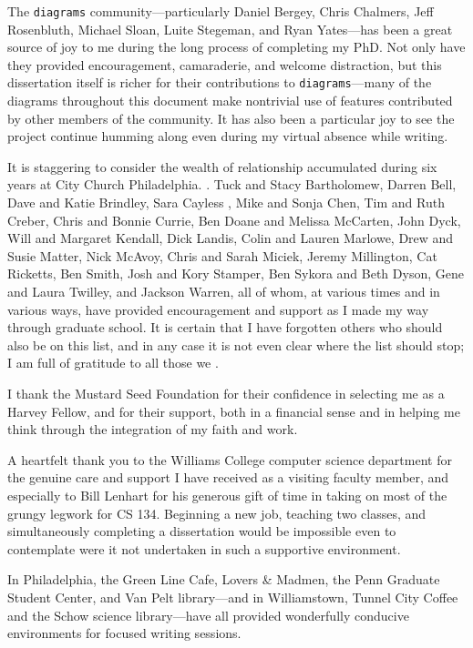The \texttt{diagrams} community---particularly Daniel Bergey, Chris
Chalmers, Jeff Rosenbluth, Michael Sloan, Luite Stegeman, and Ryan
Yates---has been a great source of joy to me during the long process
of completing my PhD.  Not only have they provided encouragement,
camaraderie, and welcome distraction, but this dissertation itself is
richer for their contributions to \texttt{diagrams}---many of the
diagrams throughout this document make nontrivial use of features
contributed by other members of the community.  It has also been a
particular joy to see the project continue humming along even during
my virtual absence while writing.

It is staggering to consider the wealth of relationship accumulated
during six years at City Church Philadelphia. .  Tuck and Stacy Bartholomew, Darren Bell, Dave and
Katie Brindley, Sara Cayless , Mike and Sonja Chen,
Tim and Ruth Creber, Chris and Bonnie Currie, Ben Doane and Melissa
McCarten, John Dyck, Will and Margaret Kendall, Dick Landis, Colin and
Lauren Marlowe, Drew and Susie Matter, Nick McAvoy, Chris and Sarah
Miciek, Jeremy Millington, Cat Ricketts, Ben Smith, Josh and Kory
Stamper, Ben Sykora and Beth Dyson, Gene and Laura Twilley, and
Jackson Warren, all of whom, at various times and in various ways,
have provided encouragement and support as I made my way through
graduate school. It is certain that I have forgotten others who should
also be on this list, and in any case it is not even clear where the
list should stop; I am full of gratitude to all those we
.

I thank the Mustard Seed Foundation for their confidence in selecting
me as a Harvey Fellow, and for their support, both in a financial
sense and in helping me think through the integration of my faith and
work.

A heartfelt thank you to the Williams College computer science
department for the genuine care and support I have received as a
visiting faculty member, and especially to Bill Lenhart for his
generous gift of time in taking on most of the grungy legwork for CS
134.  Beginning a new job, teaching two classes, and simultaneously
completing a dissertation would be impossible even to contemplate were
it not undertaken in such a supportive environment.

In Philadelphia, the Green Line Cafe, Lovers \& Madmen, the Penn
Graduate Student Center, and Van Pelt library---and in Williamstown,
Tunnel City Coffee and the Schow science library---have all provided
wonderfully conducive environments for focused writing sessions.

